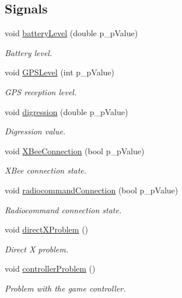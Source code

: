 \subsection*{Signals}
\begin{DoxyCompactItemize}
\item 
void \hyperlink{class_mission_control_a88b026c2eee8ec79aeb4ad7cec98144b}{battery\-Level} (double p\-\_\-p\-Value)
\begin{DoxyCompactList}\small\item\em Battery level. \end{DoxyCompactList}\item 
void \hyperlink{class_mission_control_a8eeb48700ab3f68c823a0a6e518407d9}{G\-P\-S\-Level} (int p\-\_\-p\-Value)
\begin{DoxyCompactList}\small\item\em G\-P\-S reception level. \end{DoxyCompactList}\item 
void \hyperlink{class_mission_control_a5e5bcd9d58d316f375ef94f9372b5b84}{digression} (double p\-\_\-p\-Value)
\begin{DoxyCompactList}\small\item\em Digression value. \end{DoxyCompactList}\item 
void \hyperlink{class_mission_control_a85544f091021fdbdf17464b604ce5903}{X\-Bee\-Connection} (bool p\-\_\-p\-Value)
\begin{DoxyCompactList}\small\item\em X\-Bee connection state. \end{DoxyCompactList}\item 
void \hyperlink{class_mission_control_ac52540e5863639117ba619d82bb3101e}{radiocommand\-Connection} (bool p\-\_\-p\-Value)
\begin{DoxyCompactList}\small\item\em Radiocommand connection state. \end{DoxyCompactList}\item 
void \hyperlink{class_mission_control_a2556dc79349cf6b7bb73f11ec44817fd}{direct\-X\-Problem} ()
\begin{DoxyCompactList}\small\item\em Direct X problem. \end{DoxyCompactList}\item 
void \hyperlink{class_mission_control_ae5992b2a834b918f6a9ad39f96070b2b}{controller\-Problem} ()
\begin{DoxyCompactList}\small\item\em Problem with the game controller. \end{DoxyCompactList}\item 

\end{DoxyCompactItemize}
